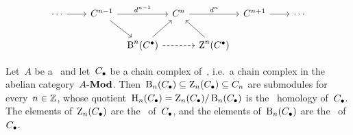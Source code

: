 \begin{definition}
\begin{enumerate}
\[\begin{tikzcd}[column sep = tiny]
            \dotsb
            \arrow{rr}
          & {}
          & C^{n-1}
            \arrow{rr}[above]{d^{n-1}}
            \arrow{dr}
          & {}
          & C^n
            \arrow{rr}[above]{d^n}
          & {}
          & C^{n+1}
            \arrow{rr}
          & {}
          & \dotsb
          \\
            {}
          & {}
          & {}
          & \Bl^n(\Cccc)
            \arrow{ur}
            \arrow[dashed]{rr}
          & {}
          & \Zl^n(\Cccc)
            \arrow{ul}
          & {}
          & {}
          & {}
        \end{tikzcd}
      \]
  \end{enumerate}
\end{definition}


\begin{example*}
  Let~$A$ be a~{\kalg} and let~$C_\bullet$ be a chain complex of~{}, i.e.\ a chain complex in the abelian category~$\text{$A$-$\mathbf{Mod}$}$.
  Then~$\operatorname{B}_n(C_\bullet) \subseteq \operatorname{Z}_n(C_\bullet) \subseteq C_n$ are submodules for every~$n \in \mathbb{Z}$, whose quotient~$\operatorname{H}_n(C_\bullet) = \operatorname{Z}_n(C_\bullet)/\operatorname{B}_n(C_\bullet)$ is the~ homology of~$C_\bullet$.
  The elements of~$\operatorname{Z}_n(C_\bullet)$ are the~\emph{} of~$C_\bullet$, and the elements of~$\operatorname{B}_n(C_\bullet)$ are the~\emph{} of~$C_\bullet$.
\end{example*}



